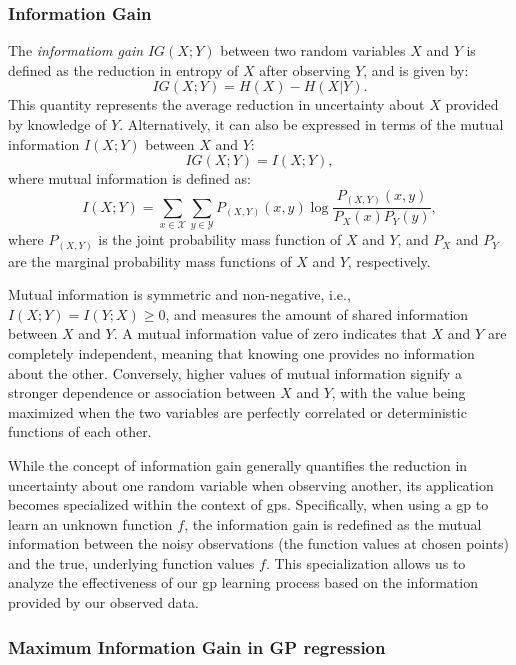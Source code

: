 \subsubsection{Information Gain}
\label{section:information_gain}
The \textit{informatiom gain} $IG(X; Y)$ between two random variables $X$ and $Y$ is defined as the reduction in entropy of $X$ after observing $Y$, and is given by:
\[
IG(X; Y) = H(X) - H(X \vert Y).
\]
This quantity represents the average reduction in uncertainty about $X$ provided by knowledge of $Y$. Alternatively, it can also be expressed in terms of the mutual information $I(X; Y)$ between $X$ and $Y$:
\[
IG(X; Y) = I(X; Y),
\]
where mutual information is defined as:
\[
I(X; Y) = \sum_{x \in \mathcal{X}} \sum_{y \in \mathcal{Y}} P_{(X, Y)}(x, y) \log \frac{P_{(X, Y)}(x, y)}{P_X(x) P_Y(y)},
\]
where \( P_{(X, Y)} \) is the joint probability mass function of \( X \) and \( Y \), and \( P_X \) and \( P_Y \) are the marginal probability mass functions of \( X \) and \( Y \), respectively.

Mutual information is symmetric and non-negative, i.e., $I(X; Y) = I(Y; X) \geq 0$, and measures the amount of shared information between $X$ and $Y$. A mutual information value of zero indicates that $X$ and $Y$ are completely independent, meaning that knowing one provides no information about the other. Conversely, higher values of mutual information signify a stronger dependence or association between $X$ and $Y$, with the value being maximized when the two variables are perfectly correlated or deterministic functions of each other.

While the concept of information gain generally quantifies the reduction in uncertainty about one random variable when observing another, its application becomes specialized within the context of \acp{gp}. Specifically, when using a \ac{gp} to learn an unknown function $f$, the information gain is redefined as the mutual information between the noisy observations (the function values at chosen points) and the true, underlying function values $f$. This specialization allows us to analyze the effectiveness of our \ac{gp} learning process based on the information provided by our observed data. 
\subsubsection{Maximum Information Gain in GP regression}

